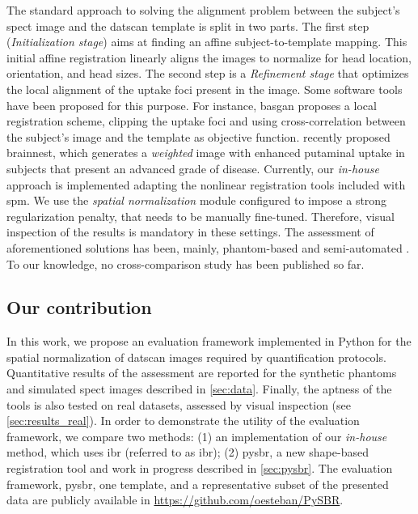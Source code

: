 \documentclass{frontiers}
\newcommand{\cbstart}{\relax}
\newcommand{\cbend}{\relax}
\begin{document}
The standard approach to solving the alignment problem between the subject's
  \gls*{spect} image and the \gls*{datscan} template is split in two parts.
The first step (\emph{Initialization stage}) aims at finding an affine subject-to-template mapping.
This initial affine registration linearly aligns the images to normalize for 
   head location, orientation, and head sizes.
The second step is a \emph{Refinement stage} that optimizes the local alignment of
  the uptake foci present in the image.
Some software tools have been proposed for this purpose.
For instance, \gls*{basgan} proposes a local registration scheme, clipping the 
  uptake foci and using cross-correlation between the subject's image and 
  the template as objective function.
\citeauthor{ciarmiello_weighted_2013} recently proposed \gls*{brainnest}, which
  generates a \emph{weighted} image with enhanced putaminal uptake in
  subjects that present an advanced grade of disease.
\cbstart
Currently, our \emph{in-house} approach is implemented adapting the nonlinear registration
  tools included with \gls*{spm}.
We use the \emph{spatial normalization} module configured to impose a strong regularization penalty,
  that needs to be manually fine-tuned.
Therefore, visual inspection of the results is mandatory in these settings.
\cbend
The assessment of aforementioned solutions has been, mainly, phantom-based
  and semi-automated \citep{skanjeti_assessing_2013}.
To our knowledge, no cross-comparison study has been published so far.


\cbstart
\subsection{Our contribution}\label{sec:contribution}
In this work, we propose an evaluation framework implemented in Python for the
  spatial normalization of \gls*{datscan} images required by quantification
  protocols.
Quantitative results of the assessment are reported for the synthetic
  phantoms and simulated \gls*{spect} images described in \autoref{sec:data}.
Finally, the aptness of the tools is also tested on real datasets,
  assessed by visual inspection (see \autoref{sec:results_real}).
In order to demonstrate the utility of the evaluation framework, we compare 
  two methods:
(1) an implementation of our \emph{in-house} method, which uses \acrlong*{ibr}
  (referred to as \acrshort*{ibr});
(2) \gls*{pysbr}, a new shape-based registration tool and
  work in progress described in \autoref{sec:pysbr}.
\cbend
The evaluation framework, \gls*{pysbr}, one template,
  and a representative subset of the presented data are publicly 
  available in \url{https://github.com/oesteban/PySBR}.
\end{document}
